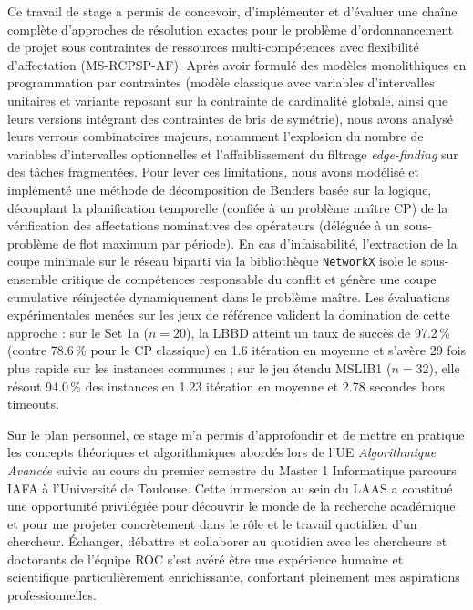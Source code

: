 
Ce travail de stage a permis de concevoir, d'implémenter et d'évaluer une chaîne complète d'approches de résolution exactes pour le problème d'ordonnancement de projet sous contraintes de ressources multi-compétences avec flexibilité d'affectation (MS-RCPSP-AF). Après avoir formulé des modèles monolithiques en programmation par contraintes (modèle classique avec variables d'intervalles unitaires et variante reposant sur la contrainte de cardinalité globale, ainsi que leurs versions intégrant des contraintes de bris de symétrie), nous avons analysé leurs verrous combinatoires majeurs, notamment l'explosion du nombre de variables d'intervalles optionnelles et l'affaiblissement du filtrage \textit{edge-finding} sur des tâches fragmentées. Pour lever ces limitations, nous avons modélisé et implémenté une méthode de décomposition de Benders basée sur la logique, découplant la planification temporelle (confiée à un problème maître CP) de la vérification des affectations nominatives des opérateurs (déléguée à un sous-problème de flot maximum par période). En cas d'infaisabilité, l'extraction de la coupe minimale sur le réseau biparti via la bibliothèque \texttt{NetworkX} isole le sous-ensemble critique de compétences responsable du conflit et génère une coupe cumulative réinjectée dynamiquement dans le problème maître. Les évaluations expérimentales menées sur les jeux de référence valident la domination de cette approche : sur le Set 1a ($n=20$), la LBBD atteint un taux de succès de 97.2\,\% (contre 78.6\,\% pour le CP classique) en 1.6 itération en moyenne et s'avère 29 fois plus rapide sur les instances communes ; sur le jeu étendu MSLIB1 ($n=32$), elle résout 94.0\,\% des instances en 1.23 itération en moyenne et 2.78 secondes hors timeouts.

\bigskip

Sur le plan personnel, ce stage m'a permis d'approfondir et de mettre en pratique les concepts théoriques et algorithmiques abordés lors de l'UE \textit{Algorithmique Avancée} suivie au cours du premier semestre du Master 1 Informatique parcours IAFA à l'Université de Toulouse. Cette immersion au sein du LAAS a constitué une opportunité privilégiée pour découvrir le monde de la recherche académique et pour me projeter concrètement dans le rôle et le travail quotidien d'un chercheur. Échanger, débattre et collaborer au quotidien avec les chercheurs et doctorants de l'équipe ROC s'est avéré être une expérience humaine et scientifique particulièrement enrichissante, confortant pleinement mes aspirations professionnelles.

